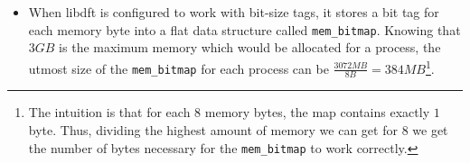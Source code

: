 \documentclass[LaM,binding=0.6cm]{sapthesis}
\begin{document}
\begin{itemize}
Each \texttt{STAB} entry corresponds to a page-size area\footnote{The usual page size in $32$-bits Windows architecture is $4$KB.} and holds a $32$-bits offset used to access all memory addresses inside that page. The virtual address tag is retrieved into two steps (see listing \ref{lst:virttobyte}):
\begin{lstlisting} [language={C++}, label={lst:virttobyte}, caption={Code snippet to retrieve the tag byte of any memory address.}]
/*STAB[vaddr >> 12] contains the specific offset of vaddr.*/
offset = STAB[vaddr >> 12];
/*
* taddr is the memory map address
* containing the respective byte tag.
*/
taddr = vaddr + offset;
\end{lstlisting}
\item When libdft is configured to work with bit-size tags, it stores a bit tag for each memory byte into a flat data structure called \texttt{mem\_bitmap}. Knowing that $3GB$ is the maximum memory which would be allocated for a process, the utmost size of the \texttt{mem\_bitmap} for each process can be $\frac{3072MB}{8B} = 384MB$\footnote{The intuition is that for each $8$ memory bytes, the map contains exactly $1$ byte. Thus, dividing the highest amount of memory we can get for $8$ we get the number of bytes necessary for the \texttt{mem\_bitmap} to work correctly.}.\\


\end{itemize}
\end{document}
